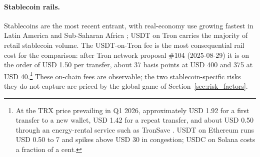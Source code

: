 \paragraph{Stablecoin rails.} Stablecoins are the most recent entrant, with real-economy use growing fastest in Latin America and Sub-Saharan Africa \citep{chainalysis_2025}; USDT on Tron carries the majority of retail stablecoin volume. The USDT-on-Tron fee is the most consequential rail cost for the comparison: after Tron network proposal \#104 (2025-08-29) it is on the order of USD 1.50 per transfer, about 37 basis points at USD 400 and 375 at USD 40.\footnote{At the TRX price prevailing in Q1 2026, approximately USD 1.92 for a first transfer to a new wallet, USD 1.42 for a repeat transfer, and about USD 0.50 through an energy-rental service such as TronSave \citep{tronsave_blog_2026}. USDT on Ethereum runs USD 0.50 to 7 and spikes above USD 30 in congestion; USDC on Solana costs a fraction of a cent.} These on-chain fees are observable; the two stablecoin-specific risks they do not capture are priced by the global game of Section~\ref{sec:risk_factors}.
